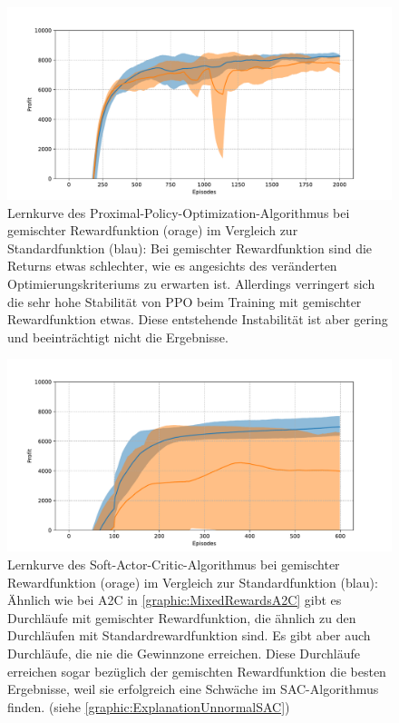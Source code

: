 \begin{figure}[htb]
	\centering
	\includegraphics[width=\textwidth]{appendix/mixed_rewards_ppo.pdf}
	\caption{
		Lernkurve des Proximal-Policy-Optimization-Algorithmus bei gemischter Rewardfunktion (orage) im Vergleich zur Standardfunktion (blau):
		Bei gemischter Rewardfunktion sind die Returns etwas schlechter, wie es angesichts des veränderten Optimierungskriteriums zu erwarten ist.
		Allerdings verringert sich die sehr hohe Stabilität von PPO beim Training mit gemischter Rewardfunktion etwas.
		Diese entstehende Instabilität ist aber gering und beeinträchtigt nicht die Ergebnisse.
	}
	\label{graphic:MixedRewardsPPO}
\end{figure}
\begin{figure}[htb]
	\centering
	\includegraphics[width=\textwidth]{appendix/mixed_rewards_sac.pdf}
	\caption{
		Lernkurve des Soft-Actor-Critic-Algorithmus bei gemischter Rewardfunktion (orage) im Vergleich zur Standardfunktion (blau):
		Ähnlich wie bei A2C in \ref{graphic:MixedRewardsA2C} gibt es Durchläufe mit gemischter Rewardfunktion, die ähnlich zu den Durchläufen mit Standardrewardfunktion sind.
		Es gibt aber auch Durchläufe, die nie die Gewinnzone erreichen.
		Diese Durchläufe erreichen sogar bezüglich der gemischten Rewardfunktion die besten Ergebnisse, weil sie erfolgreich eine Schwäche im SAC-Algorithmus finden. (siehe \ref{graphic:ExplanationUnnormalSAC})
	}
	\label{graphic:MixedRewardsSAC}
\end{figure}
